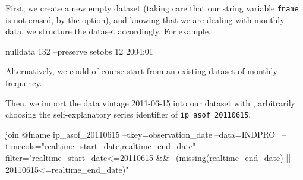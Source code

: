 First, we create a new empty dataset (taking care that our string
variable \texttt{fname} is not erased, by the 
option), and knowing that we are dealing with monthly data, we
structure the dataset accordingly. For example,
\begin{code}
nulldata 132 --preserve
setobs 12 2004:01
\end{code}

Alternatively, we could of course start from an existing dataset of
monthly frequency.

Then, we import the data vintage 2011-06-15 into our dataset
with , arbitrarily choosing the self-explanatory series
identifier of \texttt{ip\_asof\_20110615}.

\begin{code}
join @fname ip_asof_20110615 --tkey=observation_date --data=INDPRO \
--timecols="realtime_start_date,realtime_end_date" \
--filter="realtime_start_date<=20110615 && \
(missing(realtime_end_date) || 20110615<=realtime_end_date)"
\end{code}

